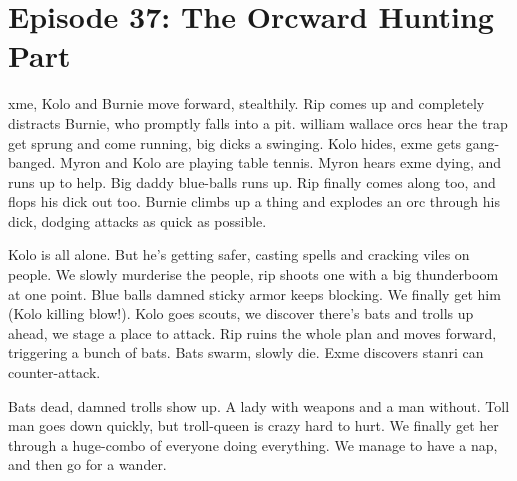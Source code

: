 \section{Episode 37: The Orcward Hunting Part}

\medskip

xme, Kolo and Burnie move forward, stealthily. Rip comes up and completely distracts Burnie, who promptly falls into a pit. william wallace orcs hear the trap get sprung and come running, big dicks a swinging. Kolo hides, exme gets gang-banged. Myron and Kolo are playing table tennis. Myron hears exme dying, and runs up to help. Big daddy blue-balls runs up. Rip finally comes along too, and flops his dick out too. Burnie climbs up a thing and explodes an orc through his dick, dodging attacks as quick as possible.\medskip

Kolo is all alone. But he’s getting safer, casting spells and cracking viles on people. We slowly murderise the people, rip shoots one with a big thunderboom at one point. Blue balls damned sticky armor keeps blocking. We finally get him (Kolo killing blow!). Kolo goes scouts, we discover there’s bats and trolls up ahead, we stage a place to attack. Rip ruins the whole plan and moves forward, triggering a bunch of bats. Bats swarm, slowly die. Exme discovers stanri can counter-attack.\medskip

Bats dead, damned trolls show up. A lady with weapons and a man without. Toll man goes down quickly, but troll-queen is crazy hard to hurt. We finally get her through a huge-combo of everyone doing everything. We manage to have a nap, and then go for a wander.



\vspace*{5mm}

